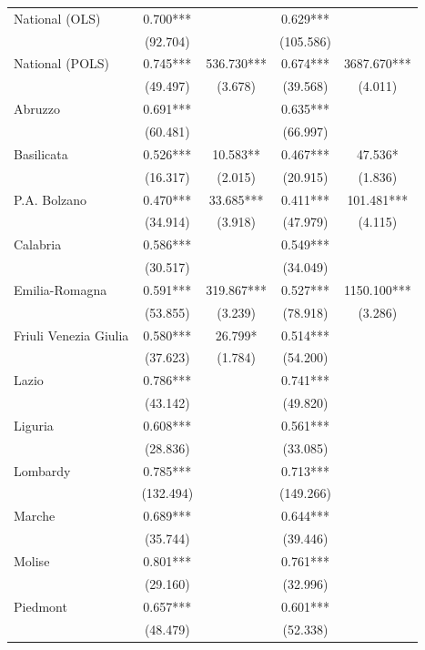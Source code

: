\documentclass[12pt]{article}
\begin{document}
\begin{appendices}
\begin{longtable}{@{}lcccc@{}}
            National (OLS) & 0.700*** &  & 0.629*** &  \\ 
             & (92.704) &  & (105.586) & \\
            National (POLS) & 0.745*** & 536.730*** & 0.674*** & 3687.670***\\ 
             & (49.497) & (3.678) & (39.568) & (4.011) \\ 
            Abruzzo & 0.691*** &  & 0.635*** &  \\ 
             & (60.481) &  & (66.997) &  \\ 
            Basilicata & 0.526*** & 10.583** & 0.467*** & 47.536* \\ 
             & (16.317) & (2.015) & (20.915) & (1.836) \\ 
            P.A. Bolzano & 0.470*** & 33.685*** & 0.411*** & 101.481*** \\ 
             & (34.914) & (3.918) & (47.979) & (4.115) \\ 
            Calabria & 0.586*** &  & 0.549*** &  \\ 
             & (30.517) &  & (34.049) &  \\ 
            Emilia-Romagna & 0.591*** & 319.867*** & 0.527*** & 1150.100*** \\ 
             & (53.855) & (3.239) & (78.918) & (3.286) \\ 
            Friuli Venezia Giulia & 0.580*** & 26.799* & 0.514*** &  \\ 
             & (37.623) & (1.784) & (54.200) &  \\ 
            Lazio & 0.786*** &  & 0.741*** &  \\ 
             & (43.142) &  & (49.820) &  \\ 
            Liguria & 0.608*** &  & 0.561*** &  \\ 
             & (28.836) &  & (33.085) &  \\ 
            Lombardy & 0.785*** &  & 0.713*** &  \\ 
             & (132.494) &  & (149.266) &  \\ 
            Marche & 0.689*** &  & 0.644*** &  \\ 
             & (35.744) &  & (39.446) &  \\ 
            Molise & 0.801*** &  & 0.761*** &  \\ 
             & (29.160) &  & (32.996) &  \\ 
            Piedmont & 0.657*** &  & 0.601*** &  \\ 
             & (48.479) &  & (52.338) &  \\ 

\end{longtable}
\end{appendices}
\end{document}
